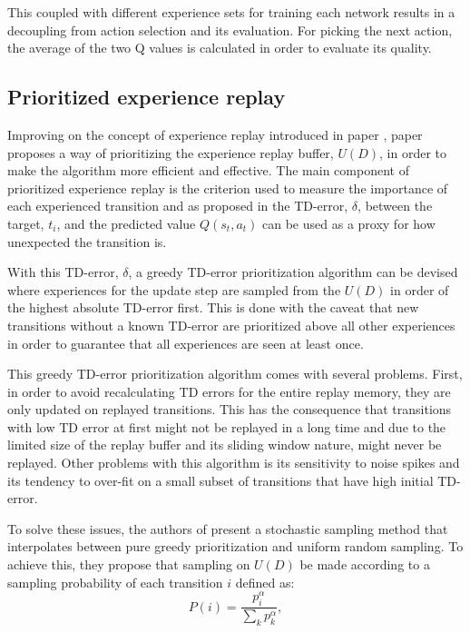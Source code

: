 This coupled with different experience sets for training each network results in a decoupling from action selection and its evaluation. For picking the next action, the average of the two Q values is calculated in order to evaluate its quality.

\subsection{Prioritized experience replay}
\noindent Improving on the concept of experience replay introduced in paper \cite{DQN}, paper \cite{prioexperience} proposes a way of prioritizing the experience replay buffer, $U(D)$, in order to make the algorithm more efficient and effective. The main component of prioritized experience replay is the criterion used to measure the importance of each experienced transition and as proposed in \cite{prioexperience} the \acrshort{TD}-error, $\delta$, between the target, $t_i$, and the predicted value $Q(s_t,a_t)$ can be used as a proxy for how unexpected the transition is.

With this \acrshort{TD}-error, $\delta$, a greedy \acrshort{TD}-error prioritization algorithm can be devised where experiences for the update step are sampled from the $U(D)$ in order of the highest absolute \acrshort{TD}-error first. This is done with the caveat that new transitions without a known \acrshort{TD}-error are prioritized above all other experiences in order to guarantee that all experiences are seen at least once.

This greedy \acrshort{TD}-error prioritization algorithm comes with several problems. First, in order to avoid recalculating \acrshort{TD} errors for the entire replay memory, they are only updated on replayed transitions. This has the consequence that transitions with low \acrshort{TD} error at first might not be replayed in a long time and due to the limited size of the replay buffer and its sliding window nature, might never be replayed. Other problems with this algorithm is its sensitivity to noise spikes and its tendency to over-fit on a small subset of transitions that have high initial \acrshort{TD}-error.

To solve these issues, the authors of \cite{prioexperience} present a stochastic sampling method that interpolates between pure greedy prioritization and uniform random sampling. To achieve this, they propose that sampling on $U(D)$ be made according to a sampling probability of each transition $i$ defined as:
\begin{equation}
    P(i) = \frac{p_i^\alpha}{\sum_k p_k^\alpha} ,
\end{equation}

